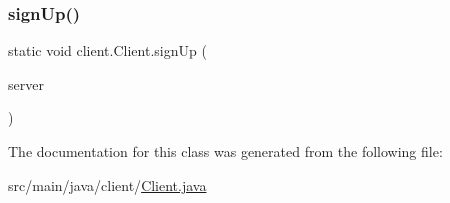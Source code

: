 \mbox{\label{classclient_1_1_client_a703b7a8ec73e49a2dafa18c0e99fc2f7}} 
\subsubsection{\texorpdfstring{sign\+Up()}{signUp()}}
{\footnotesize\ttfamily static void client.\+Client.\+sign\+Up (\begin{DoxyParamCaption}\item[{\hyperlink{interfaceserver_1_1remote_1_1_i_remote}{I\+Remote}}]{server }\end{DoxyParamCaption})\hspace{0.3cm}{\ttfamily [static]}}



The documentation for this class was generated from the following file\+:\begin{DoxyCompactItemize}
\item 
src/main/java/client/\hyperlink{_client_8java}{Client.\+java}\end{DoxyCompactItemize}
